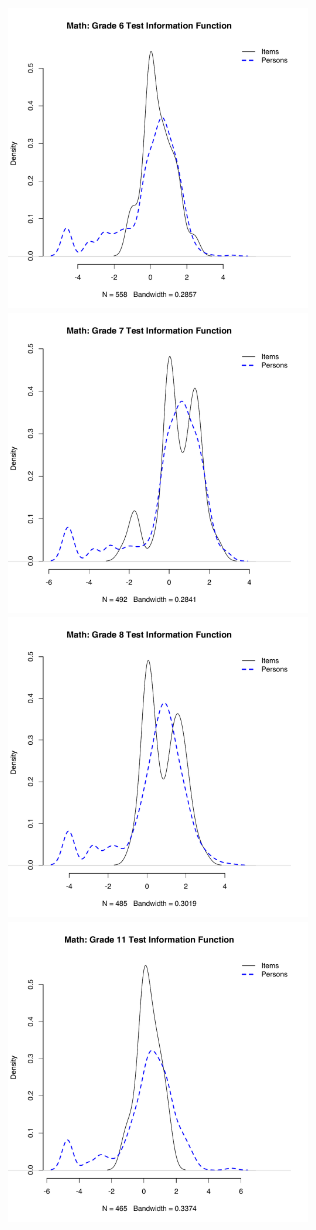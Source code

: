 \documentclass[]{article}
\begin{document}
\includegraphics[height=3.12500in]{ipdens/math6ipdens.pdf}
\includegraphics[height=3.12500in]{ipdens/math7ipdens.pdf}
\includegraphics[height=3.12500in]{ipdens/math8ipdens.pdf}
\includegraphics[height=3.12500in]{ipdens/math11ipdens.pdf} \clearpage
\end{document}
